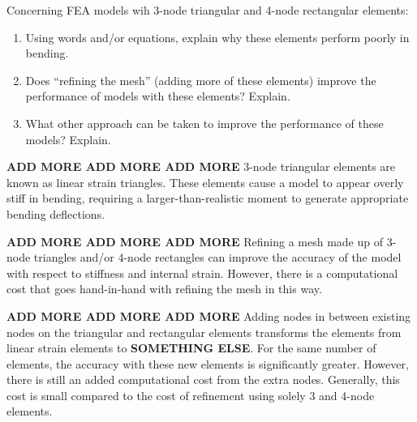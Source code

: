 \documentclass[../main.tex]{subfiles}
\begin{document}

Concerning FEA models wih 3-node triangular and 4-node rectangular elements:

\begin{enumerate}[label=\alph*)]
    \item Using words and/or equations, explain why these elements perform poorly in bending.
    \item Does ``refining the mesh'' (adding more of these elements) improve the performance of models with these elements? Explain.
    \item What other approach can be taken to improve the performance of these models? Explain.
\end{enumerate}


\textbf{ADD MORE ADD MORE ADD MORE}
3-node triangular elements are known as linear strain triangles.
These elements cause a model to appear overly stiff in bending, requiring a larger-than-realistic moment to generate appropriate bending deflections.


\textbf{ADD MORE ADD MORE ADD MORE}
Refining a mesh made up of 3-node triangles and/or 4-node rectangles can improve the accuracy of the model with respect to stiffness and internal strain.
However, there is a computational cost that goes hand-in-hand with refining the mesh in this way.


\textbf{ADD MORE ADD MORE ADD MORE}
Adding nodes in between existing nodes on the triangular and rectangular elements transforms the elements from linear strain elements to \textbf{SOMETHING ELSE}.
For the same number of elements, the accuracy with these new elements is significantly greater.
However, there is still an added computational cost from the extra nodes.
Generally, this cost is small compared to the cost of refinement using solely 3 and 4-node elements.
\end{document}
